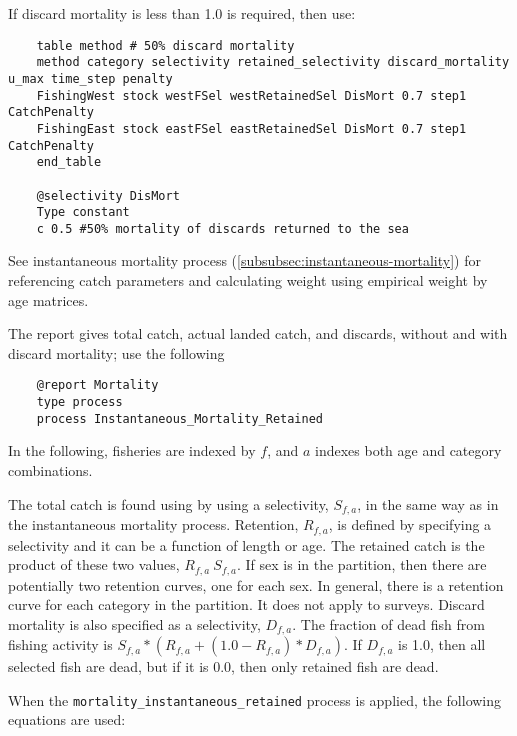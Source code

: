 If discard mortality is less than 1.0 is required, then use:

{\small{\begin{verbatim}
	table method # 50% discard mortality
	method category selectivity retained_selectivity discard_mortality u_max time_step penalty
	FishingWest stock westFSel westRetainedSel DisMort 0.7 step1 CatchPenalty
	FishingEast stock eastFSel eastRetainedSel DisMort 0.7 step1 CatchPenalty
	end_table

	@selectivity DisMort
	Type constant
	c 0.5 #50% mortality of discards returned to the sea
	\end{verbatim}}}

See instantaneous mortality process (\ref{subsubsec:instantaneous-mortality}) for referencing catch parameters and calculating weight using empirical weight by age matrices.

The report gives total catch, actual landed catch, and discards, without and with discard mortality; use the following

{\small{\begin{verbatim}
	@report Mortality
	type process
	process Instantaneous_Mortality_Retained
	\end{verbatim}}}

In the following, fisheries are indexed by $f$, and $a$ indexes both age and category combinations.

The total catch is found using by using a selectivity, $S_{f,a}$, in the same way as in the instantaneous mortality process. Retention, $R_{f,a}$, is defined by specifying a selectivity and it can be a function of length or age. The retained catch is the product of these two values, $R_{f,a} \ S_{f,a}$. If sex is in the partition, then there are potentially two retention curves, one for each sex. In general, there is a retention curve for each category in the partition. It does not apply to surveys. Discard mortality is also specified as a selectivity, $D_{f,a}$. The fraction of dead fish from fishing activity is $S_{f,a} * ( R_{f,a} + (1.0 - R_{f,a} ) * D_{f,a} )$. If $D_{f,a}$ is 1.0, then all selected fish are dead, but if it is 0.0, then only retained fish are dead.

When the \texttt{mortality\_instantaneous\_retained} process is applied, the following equations are used:

